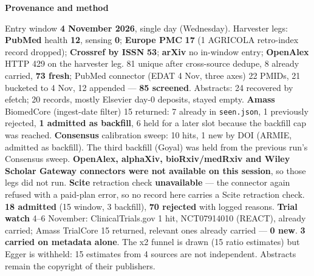 \documentclass[10pt]{article}
\begin{document}
\begin{keybox}
{\sffamily\bfseries\footnotesize\color{Deep}Provenance and method}\\[1.2mm]
{\fontsize{7.2}{8.8}\selectfont
Entry window \textbf{4 November 2026}, single day (Wednesday). Harvester legs: \textbf{PubMed} health \textbf{12}, sensing \textbf{0}; \textbf{Europe PMC} \textbf{17} (1 AGRICOLA retro-index record dropped); \textbf{Crossref by ISSN} \textbf{53}; \textbf{arXiv} no in-window entry; \textbf{OpenAlex} HTTP 429 on the harvester leg. 81 unique after cross-source dedupe, 8 already carried, \textbf{73 fresh}; PubMed connector (EDAT 4 Nov, three axes) 22 PMIDs, 21 bucketed to 4 Nov, 12 appended --- \textbf{85 screened}. Abstracts: 24 recovered by efetch; 20 records, mostly Elsevier day-0 deposits, stayed empty.
\textbf{Amass} BiomedCore (ingest-date filter) 15 returned: 7 already in \texttt{seen.json}, 1 previously rejected, \textbf{1 admitted as backfill}, 6 held for a later slot because the backfill cap was reached. \textbf{Consensus} calibration sweep: 10 hits, 1 new by DOI (ARMIE, admitted as backfill). The third backfill (Goyal) was held from the previous run's Consensus sweep. \textbf{OpenAlex, alphaXiv, bioRxiv/medRxiv and Wiley Scholar Gateway connectors were not available on this session}, so those legs did not run. \textbf{Scite} retraction check \textbf{unavailable} --- the connector again refused with a paid-plan error, so no record here carries a Scite retraction check.
\textbf{18 admitted} (15 window, 3 backfill), \textbf{70 rejected} with logged reasons. \textbf{Trial watch} 4--6 November: ClinicalTrials.gov 1 hit, NCT07914010 (REACT), already carried; Amass TrialCore 15 returned, relevant ones already carried --- \textbf{0 new}. \textbf{3 carried on metadata alone}. The x2 funnel is drawn (15 ratio estimates) but Egger is withheld: 15 estimates from 4 sources are not independent.
Abstracts remain the copyright of their publishers.\par}
\end{keybox}
\end{document}

